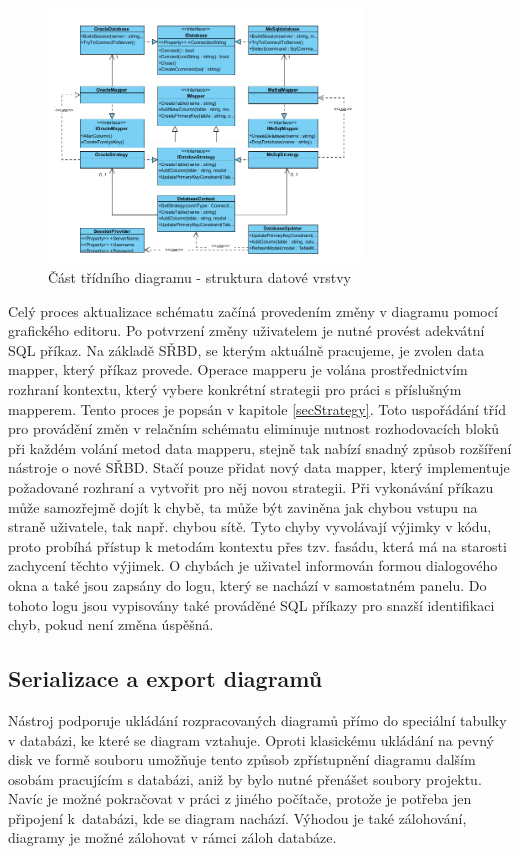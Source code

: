 \documentclass[czech,bachelor,public,dept460,male,oneside]{diploma}
\begin{document}
	\begin{figure}[!h]
		\centering
		\includegraphics[width=0.74\textwidth]{Figures/EditorSync}
		\caption{Část třídního diagramu - struktura datové vrstvy}
		\label{fig:classDiagSync}
	\end{figure}
	
	Celý proces aktualizace schématu začíná provedením změny v diagramu pomocí grafického editoru. Po potvrzení změny uživatelem je nutné provést adekvátní SQL příkaz. Na základě SŘBD, se kterým aktuálně pracujeme, je zvolen data mapper, který příkaz provede. Operace mapperu je volána prostřednictvím rozhraní kontextu, který vybere konkrétní strategii pro práci s příslušným mapperem. Tento proces je popsán v kapitole \ref{secStrategy}. Toto uspořádání tříd pro provádění změn v relačním schématu eliminuje nutnost rozhodovacích bloků při každém volání metod data mapperu, stejně tak nabízí snadný způsob rozšíření nástroje o nové SŘBD. Stačí pouze přidat nový data mapper, který implementuje požadované rozhraní a vytvořit pro něj novou strategii. Při vykonávání příkazu může samozřejmě dojít k chybě, ta může být zaviněna jak chybou vstupu na straně uživatele, tak např. chybou sítě. Tyto chyby vyvolávají výjimky v kódu, proto probíhá přístup k metodám kontextu přes tzv. fasádu, která má na starosti zachycení těchto výjimek. O chybách je uživatel informován formou dialogového okna a také jsou zapsány do logu, který se nachází v samostatném panelu. Do tohoto logu jsou vypisovány také prováděné SQL příkazy pro snazší identifikaci chyb, pokud není změna úspěšná.
	
	\subsection{Serializace a export diagramů}
	Nástroj podporuje ukládání rozpracovaných diagramů přímo do speciální tabulky v databázi, ke které se diagram vztahuje. Oproti klasickému ukládání na pevný disk ve formě souboru umožňuje tento způsob zpřístupnění diagramu dalším osobám pracujícím s databázi, aniž by bylo nutné přenášet soubory projektu. Navíc je možné pokračovat v práci z jiného počítače, protože je potřeba jen připojení k~databázi, kde se diagram nachází. Výhodou je také zálohování, diagramy je možné zálohovat v rámci záloh databáze.
	
\end{document}
